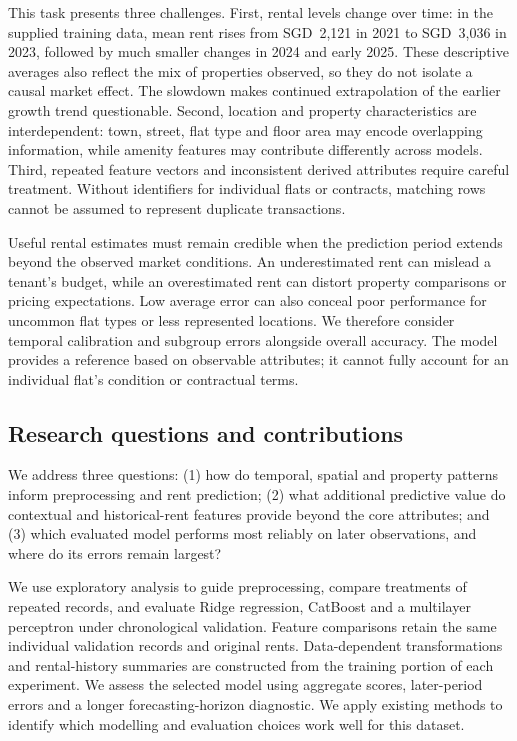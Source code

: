 \documentclass[conference]{IEEEtran}
\begin{document}
This task presents three challenges. First, rental levels change over time: in
the supplied training data, mean rent rises from SGD~2,121 in 2021 to
SGD~3,036 in 2023, followed by much smaller changes in 2024 and early 2025.
These descriptive averages also reflect the mix of properties observed, so
they do not isolate a causal market effect. The slowdown makes continued
extrapolation of the earlier growth trend questionable. Second, location and
property characteristics are interdependent: town, street, flat type and floor
area may encode overlapping information, while amenity features may contribute
differently across models. Third, repeated feature vectors and inconsistent
derived attributes require careful treatment. Without identifiers for
individual flats or contracts, matching rows cannot be assumed to represent
duplicate transactions.

Useful rental estimates must remain credible when the prediction period
extends beyond the observed market conditions. An underestimated rent can
mislead a tenant's budget, while an overestimated rent can distort property
comparisons or pricing expectations. Low average error can also conceal
poor performance for uncommon flat types or less represented locations.
We therefore consider temporal calibration and subgroup errors alongside
overall accuracy. The model provides a reference based on observable attributes; it cannot
fully account for an individual flat's condition or contractual terms.

\subsection{Research questions and contributions}
We address three questions: (1) how do temporal, spatial and property
patterns inform preprocessing and rent prediction; (2) what additional
predictive value do contextual and historical-rent features provide beyond
the core attributes; and (3) which evaluated model performs most reliably
on later observations, and where do its errors remain largest?

We use exploratory analysis to guide preprocessing, compare treatments of
repeated records, and evaluate Ridge
regression, CatBoost and a multilayer perceptron under chronological
validation. Feature comparisons retain the same individual validation
records and original rents. Data-dependent transformations and rental-history
summaries are constructed from the training portion of each experiment.
We assess the selected model using aggregate scores, later-period errors
and a longer forecasting-horizon diagnostic. We apply existing methods
to identify which modelling and evaluation choices work well for this dataset.
\end{document}
